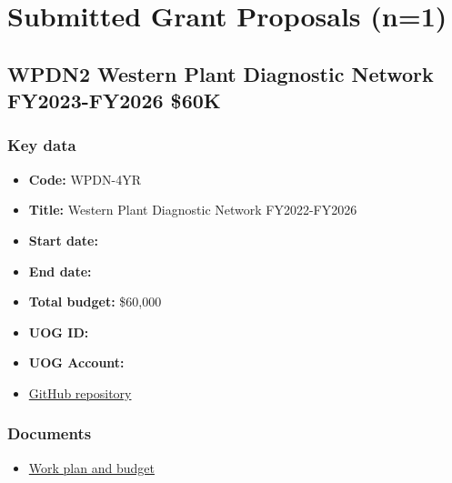 \newpage
\section{Submitted Grant Proposals (n=1)}

\subsection{WPDN2 Western Plant Diagnostic Network FY2023-FY2026 \$60K}
\label{WPDN4YR}

\subsubsection{Key data}
\begin{itemize}
	\setlength\itemsep{0em}	
	\item \textbf{Code:} WPDN-4YR
	\item \textbf{Title:} Western Plant Diagnostic Network FY2022-FY2026
	\item \textbf{Start date:}
	\item \textbf{End date:}
	\item \textbf{Total budget:} \$60,000
	\item \textbf{UOG ID:}
	\item \textbf{UOG Account:}
	\item \href{https://github.com/aubreymoore/WPDN/tree/main/4year}{GitHub repository}
\end{itemize}

\subsubsection{Documents}
\begin{itemize}
	\setlength\itemsep{0em}	
	\item \href{https://github.com/aubreymoore/WPDN/raw/main/4year/WPDN\%20FY23-FY26\%20workplan\%20and\%20budget\%20for\%20UOG.pdf}{Work plan and budget}
\end{itemize}





